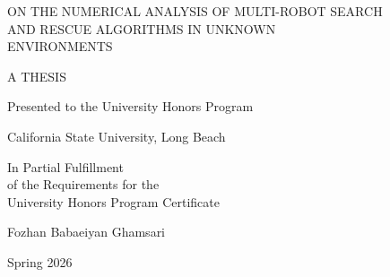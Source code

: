 \pagestyle{empty}
\thispagestyle{empty}
\begin{doublespacing}
\begin{center}
\normalfont
\vspace*{0.5in}
ON THE NUMERICAL ANALYSIS OF MULTI-ROBOT SEARCH\\
AND RESCUE ALGORITHMS IN UNKNOWN\\
ENVIRONMENTS

\vspace{0.75in}
A THESIS

\vspace{0.5in}
Presented to the University Honors Program

California State University, Long Beach

\vspace{0.5in}
In Partial Fulfillment\\
of the Requirements for the\\
University Honors Program Certificate

\vspace{0.75in}
Fozhan Babaeiyan Ghamsari

\vspace{0.5in}
Spring 2026
\end{center}
\end{doublespacing}
\clearpage
